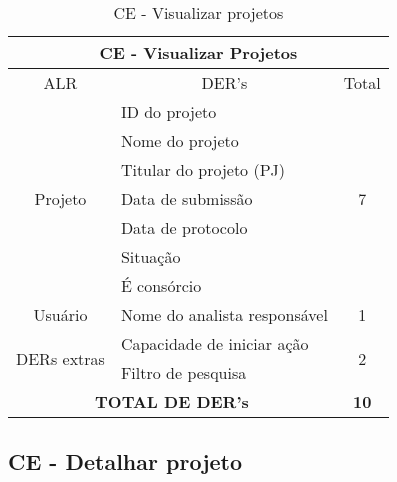       \begin{table}[!h]
      \centering
      \caption{CE - Visualizar projetos}
      \label{ce_visualizar_projetos}
      \begin{tabular}{|c|l|c|}
      \hline
      \multicolumn{3}{|c|}{CE - Visualizar Projetos}                                                              \\ \hline
      ALR                                                & \multicolumn{1}{c|}{DER's}   & Total              \\ \hline
      \multirow{7}{*}{Projeto}                           & ID do projeto                & \multirow{7}{*}{7} \\ \cline{2-2}
							& Nome do projeto              &                    \\ \cline{2-2}
							& Titular do projeto (PJ)      &                    \\ \cline{2-2}
							& Data de submissão            &                    \\ \cline{2-2}
							& Data de protocolo            &                    \\ \cline{2-2}
							& Situação                     &                    \\ \cline{2-2}
							& É consórcio                  &                    \\ \hline
      Usuário                                            & Nome do analista responsável & 1                  \\ \hline
      \multicolumn{1}{|l|}{\multirow{2}{*}{DERs extras}} & Capacidade de iniciar ação   & \multirow{2}{*}{2} \\ \cline{2-2}
      \multicolumn{1}{|l|}{}                             & Filtro de pesquisa             &                    \\ \hline
      \multicolumn{2}{|c|}{\textbf{TOTAL DE DER's}}                                     & \textbf{10}        \\ \hline
      \end{tabular}
      \end{table}
      
   \subsection{CE - Detalhar projeto}
   
